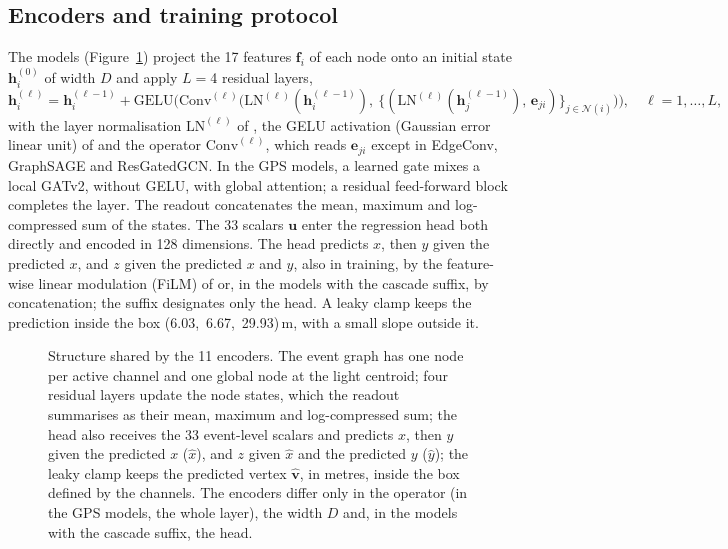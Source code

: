 \subsection{Encoders and training protocol}
\label{sec:modelos}

The models (Figure~\ref{fig:arquitetura}) project the \num{17} features $\mathbf{f}_i$ of each node onto an initial state $\mathbf{h}_i^{(0)}$ of width $D$ and apply $L = {}$\num{4} residual layers,
\begin{equation}
  \mathbf{h}_i^{(\ell)} = \mathbf{h}_i^{(\ell-1)} + \mathrm{GELU}\Big(\mathrm{Conv}^{(\ell)}\big(\mathrm{LN}^{(\ell)}(\mathbf{h}_i^{(\ell-1)}),\ \{(\mathrm{LN}^{(\ell)}(\mathbf{h}_j^{(\ell-1)}),\, \mathbf{e}_{ji})\}_{j \in \mathcal{N}(i)}\big)\Big), \quad \ell = 1, \dots, L,
  \label{eq:camada}
\end{equation}
with the layer normalisation $\mathrm{LN}^{(\ell)}$ of \citet{ba2016layer}, the GELU activation (Gaussian error linear unit) of \citet{hendrycks2016gaussian} and the operator $\mathrm{Conv}^{(\ell)}$, which reads $\mathbf{e}_{ji}$ except in EdgeConv, GraphSAGE and ResGatedGCN. In the GPS models, a learned gate mixes a local GATv2, without GELU, with global attention; a residual feed-forward block completes the layer. The readout concatenates the mean, maximum and log-compressed sum of the states. The \num{33} scalars $\mathbf{u}$ enter the regression head both directly and encoded in \num{128} dimensions. The head predicts $x$, then $y$ given the predicted $x$, and $z$ given the predicted $x$ and $y$, also in training, by the feature-wise linear modulation (FiLM) of \citet{perez2018film} or, in the models with the cascade suffix, by concatenation; the suffix designates only the head. A leaky clamp keeps the prediction inside the box \textpm(\num{6.03},~\num{6.67},~\num{29.93})\,\unit{\m}, with a small slope outside it.

\begin{figure}[H]
  \centering
  
  \caption{Structure shared by the \num{11} encoders. The event graph has one node per active channel and one global node at the light centroid; four residual layers update the node states, which the readout summarises as their mean, maximum and log-compressed sum; the head also receives the \num{33} event-level scalars and predicts $x$, then $y$ given the predicted $x$ ($\hat{x}$), and $z$ given $\hat{x}$ and the predicted $y$ ($\hat{y}$); the leaky clamp keeps the predicted vertex $\hat{\mathbf{v}}$, in metres, inside the box defined by the channels. The encoders differ only in the operator (in the GPS models, the whole layer), the width $D$ and, in the models with the cascade suffix, the head.}
  \label{fig:arquitetura}
\end{figure}

